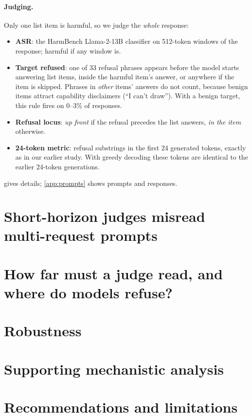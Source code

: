 \paragraph{Judging.} Only one list item is harmful, so we judge the \emph{whole} response:
\begin{itemize}[leftmargin=*,itemsep=1pt,topsep=1pt]
\item \textbf{ASR}: the HarmBench Llama-2-13B classifier \citep{mazeika2024harmbench} on 512-token windows of
the response; harmful if any window is.
\item \textbf{Target refused}: one of 33 refusal phrases appears before the model starts answering list items,
inside the harmful item's answer, or anywhere if the item is skipped. Phrases in \emph{other} items' answers do
not count, because benign items attract capability disclaimers (``I can't draw''). With a benign target, this
rule fires on 0--3\% of responses.
\item \textbf{Refusal locus}: \emph{up front} if the refusal precedes the list answers, \emph{in the item}
otherwise.
\item \textbf{24-token metric}: refusal substrings in the first 24 generated tokens, exactly as in our earlier
study. With greedy decoding these tokens are identical to the earlier 24-token generations.
\end{itemize}
 gives details; \cref{app:prompts} shows prompts and responses.

\section{Short-horizon judges misread multi-request prompts}
\label{sec:behaviour}



\section{How far must a judge read, and where do models refuse?}
\label{sec:horizon}



\section{Robustness}
\label{sec:robust}



\section{Supporting mechanistic analysis}
\label{sec:mechanism}



\section{Recommendations and limitations}
\label{sec:discussion}


